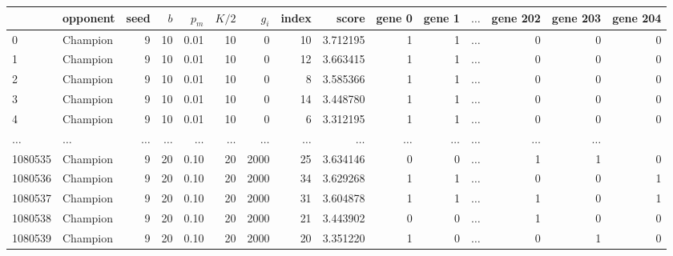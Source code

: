 \begin{tabular}{llrrrrrrrrrrrrr}
\toprule
{} &  opponent &  seed &  $b$ &  $p_m$ &  $K/2$ &  $g_i$ &  index &     score &  gene 0 &  gene 1 &  \(\dots\) &  gene 202 &  gene 203 &  gene 204 \\
\midrule
0       &  Champion &     9 &   10 &   0.01 &     10 &      0 &     10 &  3.712195 &       1 &       1 & \(\dots\) &  0 &         0 &         0 \\
1       &  Champion &     9 &   10 &   0.01 &     10 &      0 &     12 &  3.663415 &       1 &       1 & \(\dots\) &  0 &         0 &         0 \\
2       &  Champion &     9 &   10 &   0.01 &     10 &      0 &      8 &  3.585366 &       1 &       1 & \(\dots\) &  0 &         0 &         0 \\
3       &  Champion &     9 &   10 &   0.01 &     10 &      0 &     14 &  3.448780 &       1 &       1 & \(\dots\) &  0 &         0 &         0 \\
4       &  Champion &     9 &   10 &   0.01 &     10 &      0 &      6 &  3.312195 &       1 &       1 & \(\dots\) &  0 &         0 &         0 \\
\(\dots\)  &  \(\dots\)  &   \(\dots\)  &   \(\dots\)  & \(\dots\)  &  \(\dots\)  & \(\dots\)          & \(\dots\) &       \(\dots\)  &       \(\dots\)  &  \(\dots\)    & \(\dots\)  &         \(\dots\)  &         \(\dots\)  \\
1080535 &  Champion &     9 &   20 &   0.10 &     20 &   2000 &     25 &  3.634146 &       0 &       0 & \(\dots\) &  1 &         1 &         0 \\
1080536 &  Champion &     9 &   20 &   0.10 &     20 &   2000 &     34 &  3.629268 &       1 &       1 & \(\dots\) &  0 &         0 &         1 \\
1080537 &  Champion &     9 &   20 &   0.10 &     20 &   2000 &     31 &  3.604878 &       1 &       1 & \(\dots\) &  1 &         0 &         1 \\
1080538 &  Champion &     9 &   20 &   0.10 &     20 &   2000 &     21 &  3.443902 &       0 &       0 & \(\dots\) &  1 &         0 &         0 \\
1080539 &  Champion &     9 &   20 &   0.10 &     20 &   2000 &     20 &  3.351220 &       1 &       0 & \(\dots\) &  0 &         1 &         0 \\
\bottomrule
\end{tabular}
